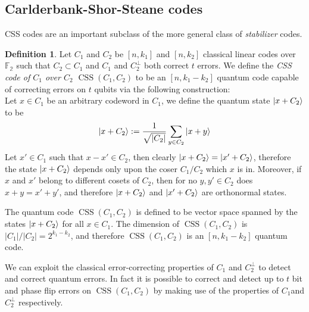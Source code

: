 \documentclass[11pt,a4paper]{article}
\theoremstyle{definition}
\newtheorem{definition}{Definition}[section]
\theoremstyle{plain}
\theoremstyle{remark}
\begin{document}
\subsection{Carlderbank-Shor-Steane codes}
CSS codes are an important subclass of the more general class of \emph{stabilizer} codes. 
\begin{definition}
Let $C_1$ and $C_2$ be $[n, k_1]$ and $[n, k_2]$ classical linear codes over $\mathbb{F_2}$ such that $C_2 \subset C_1$ and $C_1$ and $C_2^\perp$ both correct 
$t$ errors. We define the \emph{CSS code of $C_1$ over $C_2$ $\operatorname{CSS}(C_1, C_2)$} to be an $[n, k_1 - k_2]$ quantum code capable of correcting errors on $t$ qubits via the following construction: \\
Let $x \in C_1$ be an arbitrary codeword in $C_1$, we define the quantum state $\ket{x + C_2}$ to be 
$$\ket{x + C_2} := \frac{1}{\sqrt{|C_2|}} \sum_{y \in C_2} \ket{x + y}$$
Let $x' \in C_1$ such that $x - x' \in C_2$, then clearly $\ket{x + C_2} = \ket{x' + C_2}$, therefore the state $\ket{x + C_2}$ depends only upon the coser $C_1 / C_2$ which $x$ is in. 
Moreover, if $x$ and $x'$ belong to different cosets of $C_2$, then for no $y, y' \in C_2$ does $x + y = x' + y'$, and therefore $\ket{x + C_2}$ and $\ket{x' + C_2}$ are orthonormal states. 

The quantum code $\operatorname{CSS}(C_1, C_2)$ is defined to be vector space spanned by the states $\ket{x + C_2}$ for all $x \in C_1$. 
The dimension of $\operatorname{CSS}(C_1, C_2)$ is $|C_1|/|C_2| = 2^{k_1 - k_2}$, and therefore $\operatorname{CSS}(C_1, C_2)$ is an 
$[n, k_1 - k_2]$ quantum code.

We can exploit the classical error-correcting properties of $C_1$ and $C_2^\perp$ to detect and correct quantum errors. 
In fact it is possible to correct and detect up to $t$ bit and phase flip errors on $\operatorname{CSS}(C_1, C_2)$ by making use 
of the properties of $C_1 $and $C_2^\perp$ respectively. 
\end{definition}
\end{document}
